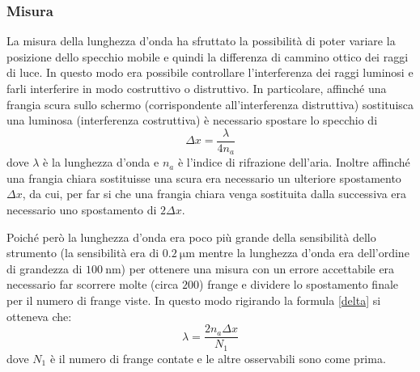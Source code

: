 \documentclass[a4paper,11pt]{article}
\begin{document}
	\subsubsection{Misura}
	La misura della lunghezza d'onda ha sfruttato la possibilità di poter variare la posizione dello specchio mobile e quindi la differenza di cammino ottico dei raggi di luce. In questo modo era possibile controllare l'interferenza dei raggi luminosi e farli interferire in modo costruttivo o distruttivo. In particolare, affinché una frangia scura sullo schermo (corrispondente all'interferenza distruttiva) sostituisca una luminosa (interferenza costruttiva) è necessario spostare lo specchio di 
	\begin{equation}\label{delta}
		\Delta x = \dfrac{\lambda}{4n_a}
	\end{equation}
	dove $ \lambda $ è la lunghezza d'onda e $ n_a $ è l'indice di rifrazione dell'aria. Inoltre affinché una frangia chiara sostituisse una scura era necessario un ulteriore spostamento $ \Delta x $, da cui, per far si che una frangia chiara venga sostituita dalla successiva era necessario uno spostamento di $ 2\Delta x $.
	
	Poiché però la lunghezza d'onda era poco più grande della sensibilità dello strumento (la sensibilità era di $ \SI{0.2}{\micro\meter} $ mentre la lunghezza d'onda era dell'ordine di grandezza di $ \SI{100}{\nano\meter} $) per ottenere una misura con un errore accettabile era necessario far scorrere molte (circa $ \num{200} $) frange e dividere lo spostamento finale per il numero di frange viste. In questo modo rigirando la formula \ref{delta} si otteneva che:
	\begin{equation}\label{lambdana}
		\lambda=\dfrac{2n_a\Delta x}{N_1}		
	\end{equation}
	dove $ N_1 $ è il numero di frange contate e le altre osservabili sono come prima.
	
\end{document}
